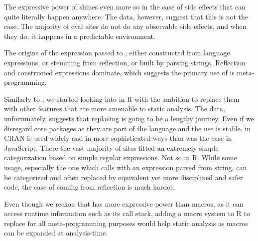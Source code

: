 \documentclass[screen,acmsmall]{acmart}%
\begin{document}
The expressive power of \eval shines even more so in the case of side effects
that can quite literally happen anywhere. The data, however, suggest that this
is not the case. The majority of eval sites do not do any observable side
effects, and when they do, it happens in a predictable environment.

The origins of the expression passed to \eval, either constructed from language
expressions, or stemming from reflection, or built by parsing strings.
Reflection and constructed expressions dominate, which suggests the primary use
of \eval is meta-programming.

Similarly to \citep{ecoop11}, we started looking into \evals in R with the
ambition to replace them with other features that are more amenable to static
analysis. The data, unfortunately, suggests that replacing \eval is going to be
a lengthy journey. Even if we disregard core packages as they are part of the
language and the \eval use is stable, in CRAN \eval is used widely and in more
sophisticated ways than was the case in JavaScript. There the vast majority of
sites fitted an extremely simple categorization based on simple regular
expressions. Not so in R. While some usage, especially the one which calls \eval
with an expression parsed from string, can be categorized and often replaced by
equivalent yet more disciplined and safer code, the case of \eval coming from
reflection is much harder.

Even though we reckon that \eval has more expressive power than macros, as it
can access runtime information such as its call stack, adding a macro system to
R to replace \eval for all meta-programming purposes would help static analysis
as macros can be expanded at analysis-time.


\end{document}
